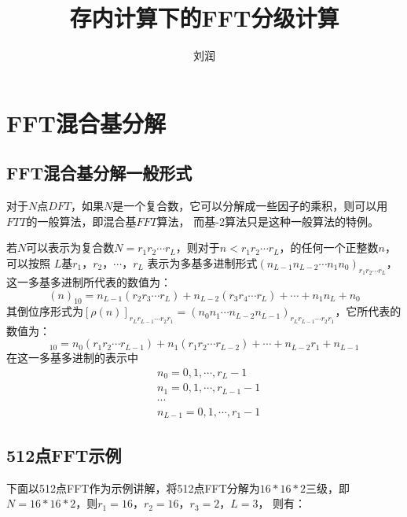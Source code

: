 \documentclass[12pt,a4paper]{article}
\title{存内计算下的FFT分级计算}
\author{刘润}
\begin{document}
\maketitle
\section{FFT混合基分解}

\subsection{FFT混合基分解一般形式}
对于$N$点$DFT$，如果$N$是一个复合数，它可以分解成一些因子的乘积，则可以用$FTT$的一般算法，即混合基$FFT$算法，
而基-2算法只是这种一般算法的特例。

若$N$可以表示为复合数$N=r_1r_2 \cdots r_L$，则对于$n<r_1r_2 \cdots r_L$，的任何一个正整数$n$，可以按照
$L$基$r_1$，$r_2$，$\cdots$，$r_L$ 表示为多基多进制形式$(n_{L-1}n_{L-2} \cdots n_1n_0)_{r_1r_2 \cdots r_L}$，
这一多基多进制所代表的数值为：
\begin{equation}
    (n)_{10} = n_{L-1}(r_2r_3 \cdots r_L) + n_{L-2}(r_3r_4 \cdots r_L) + \cdots + n_1n_L + n_0
\end{equation}
其倒位序形式为$[\rho(n)]_{r_Lr_{L-1} \cdots r_2r_1} = (n_0n_1 \cdots n_{L-2}n_{L-1})_{r_Lr_{L-1} \cdots r_2r_1}$，它所代表的数值为：
\begin{equation}
    [\rho(n)]_{10}=n_0(r_1r_2 \cdots r_{L-1}) + n_1(r_1r_2 \cdots r_{L-2}) + \cdots + n_{L-2}r_1 + n_{L-1}
\end{equation}
在这一多基多进制的表示中
\begin{equation}
\begin{aligned}
    &n_0 = 0,1,\cdots ,r_{L}-1 \\
    &n_1 = 0,1,\cdots ,r_{L-1}-1 \\
    &\cdots \\
    &n_{L-1} = 0,1,\cdots ,r_1-1
\end{aligned}
\end{equation}


\subsection{512点FFT示例}
下面以512点FFT作为示例讲解，将512点FFT分解为$16*16*2$三级，即$N=16*16*2$，则$r_1=16$，$r_2=16$，$r_3=2$，$L=3$，
则有：
\end{document}

